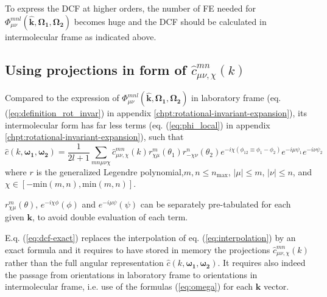 To express the DCF at higher orders, the number of FE needed for $\Phi_{\mu\nu}^{mnl}(\mathbf{\hat{k}},\mathbf{\Omega_{1}},\mathbf{\Omega_{2}})$
becomes huge and the DCF should be calculated in intermolecular frame
as indicated above.


\subsection{Using projections in form of $\hat{c}_{\mu\nu,\chi}^{mn}(k)$\label{sub:Using-projections-in-1}}

Compared to the expression of $\Phi_{\mu\nu}^{mnl}(\mathbf{\hat{k}},\mathbf{\Omega_{1}},\mathbf{\Omega_{2}})$
in laboratory frame (eq. (\ref{eq:definition_rot_invar}) in appendix
\ref{chpt:rotational-invariant-expansion}), its intermolecular form
has far less terms (eq. (\ref{eq:phi_local}) in appendix \ref{chpt:rotational-invariant-expansion}),
such that
\begin{equation}
\hat{c}(k,\boldsymbol{\omega_{1}},\boldsymbol{\omega_{2}})=\frac{1}{2l+1}\sum_{mn\mu\nu\chi}\hat{c}_{\mu\nu,\chi}^{mn}(k)r_{\chi\mu}^{m}(\theta_{1})r_{-\chi\nu}^{n}(\theta_{2})e^{-i\chi(\phi_{12}\equiv\phi_{1}-\phi_{2})}e^{-i\mu\psi_{1}}e^{-i\nu\psi_{2}}\label{eq:dcf-exact}
\end{equation}
where $r$ is the generalized Legendre polynomial,$m,n\leq n{}_{\mathrm{max}}$,
$\left|\mu\right|\leq m$, $\left|\nu\right|\leq n$, and $\chi\in\left[-\mathrm{min}(m,n),\mathrm{min}(m,n)\right]$.

$r_{\chi\mu}^{m}(\theta)$, $e^{-i\chi\phi}(\phi)$ and $e^{-i\mu\psi}(\psi)$
can be separately pre-tabulated for each given $\mathbf{k}$, to avoid
double evaluation of each term.

E.q. (\ref{eq:dcf-exact}) replaces the interpolation of eq. (\ref{eq:interpolation})
by an exact formula and it requires to have stored in memory the projections
$\hat{c}_{\mu\nu,\chi}^{mn}(k)$ rather than the full angular representation
$\hat{c}(k,\boldsymbol{\omega_{1}},\boldsymbol{\omega_{2}})$. It
requires also indeed the passage from orientations in laboratory frame
to orientations in intermolecular frame, i.e. use of the formulas
(\ref{eq:omega}) for each $\mathbf{k}$ vector.

